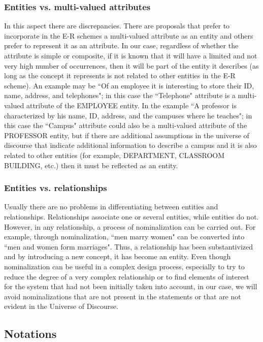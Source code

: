 \documentclass{article}
\numberwithin{figure}{section}
\begin{document}
\subsubsection{Entities vs. multi-valued attributes}

In this aspect there are discrepancies.  There are proposals that prefer to incorporate in the E-R schemes a multi-valued attribute as an entity and others prefer to represent it as an attribute.  In our case, regardless of whether the attribute is simple or composite, if it is known that it will have a limited and not very high number of occurrences, then it will be part of the entity it describes (as long as the concept it represents is not related to other entities in the E-R scheme).  An example may be ``Of an employee it is interesting to store their ID, name, address, and telephones"; in this case the ``Telephone" attribute is a multi-valued attribute of the EMPLOYEE entity.  In the example ``A professor is characterized by his name, ID, address, and the campuses where he teaches"; in this case the ``Campus" attribute could also be a multi-valued attribute of the PROFESSOR entity, but if there are additional assumptions in the universe of discourse that indicate additional information to describe a campus and it is also related to other entities (for example, DEPARTMENT, CLASSROOM BUILDING, etc.) then it must be reflected as an entity.

\subsubsection{Entities vs. relationships}

Usually there are no problems in differentiating between entities and relationships.  Relationships associate one or several entities, while entities do not.  However, in any relationship, a process of nominalization can be carried out.  For example, through nominalization, ``men marry women" can be converted into ``men and women form marriages".  Thus, a relationship has been substantivized and by introducing a new concept, it has become an entity.  Even though nominalization can be useful in a complex design process, especially to try to reduce the degree of a very complex relationship or to find elements of interest for the system that had not been initially taken into account, in our case, we will avoid nominalizations that are not present in the statements or that are not evident in the Universe of Discourse.

\subsection{Notations}
\end{document}
